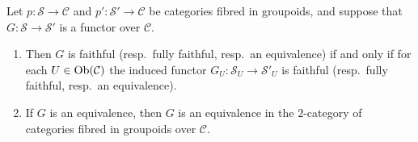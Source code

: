 \begin{lemma}
\label{lemma-equivalence-fibred-categories}
Let $p : \mathcal{S}\to \mathcal{C}$ and
$p' : \mathcal{S'}\to \mathcal{C}$ be categories fibred in groupoids, and
suppose that $G : \mathcal{S}\to \mathcal {S}'$ is a functor over
$\mathcal{C}$.
\begin{enumerate}
\item Then $G$ is faithful (resp.\ fully faithful, resp.\ an equivalence)
if and only if for each $U\in\mathop{\mathrm{Ob}}\nolimits(\mathcal{C})$ the induced functor
$G_U : \mathcal{S}_U\to \mathcal{S}'_U$ is faithful
(resp.\ fully faithful, resp.\ an equivalence).
\item If $G$ is an equivalence, then $G$ is an equivalence in the
$2$-category of categories fibred in groupoids over $\mathcal{C}$.
\end{enumerate}
\end{lemma}

